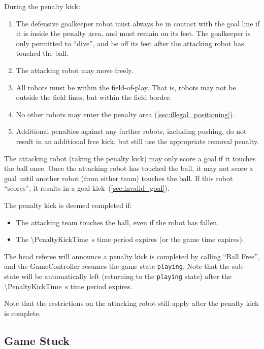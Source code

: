 During the penalty kick:
\begin{enumerate}
  \item The defensive goalkeeper robot must always be in contact with the goal line if it is inside the penalty area, and must remain on its feet.
    The goalkeeper is only permitted to ``dive'', and be off its feet after the attacking robot has touched the ball.
  \item The attacking robot may move freely.
  \item All robots must be within the field-of-play.
    That is, robots may not be outside the field lines, but within the field border.
  \item No other robots may enter the penalty area (\cf \cref{sec:illegal_positioning}).
  \item Additional penalties against any further robots, including pushing, do not result in an additional free
    kick, but still use the appropriate removal penalty.
\end{enumerate}

The attacking robot (taking the penalty kick) may only score a goal if it touches the ball once.
Once the attacking robot has touched the ball, it may not score a goal until another robot (from either team) touches the ball.
If this robot ``scores'', it results in a goal kick~(\cf \cref{sec:invalid_goal}).

The penalty kick is deemed completed if:
\begin{itemize}
  \item The attacking team touches the ball, even if the robot has fallen.
  \item The \qty{\PenaltyKickTime}{\second} time period expires (or the game time expires).
\end{itemize}

The head referee will announce a penalty kick is completed by calling ``Ball Free'', and the GameController resumes the game state \texttt{playing}.
Note that the sub-state will be automatically left (returning to the \texttt{playing} state) after the \qty{\PenaltyKickTime}{\second} time period expires.

Note that the restrictions on the attacking robot still apply after the penalty kick is complete.

\subsection{Game Stuck}
\label{sec:game_stuck}

